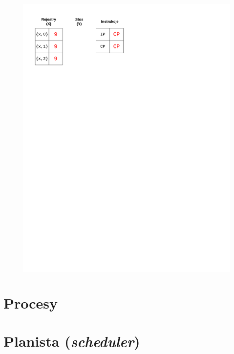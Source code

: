 \begin{figure}
\begin{multicols}{2}
\vspace{-4mm}
\begin{Figure}
 \centering
 \includegraphics[scale=0.65, clip, trim=0 215mm 110mm 0]{interpreter_max_8}
\label{fig:max8}
\end{Figure}
\end{multicols}
\end{figure}


\section{Procesy}
\label{sec:maszynaProcesy}

\section{Planista (\emph{scheduler})}
\label{sec:maszynaScheduler}

